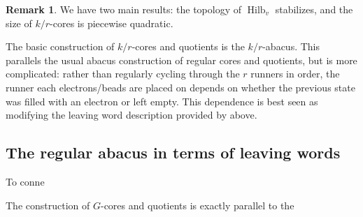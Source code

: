 \documentclass{amsart}[12pt]
\theoremstyle{definition}
\newtheorem{remark}[dummy]{Remark}
\DeclareMathOperator{\Hilb}{Hilb}
\begin{document}
\begin{remark}
We have two main results: the topology of $\Hilb_v$ stabilizes, and the size of $k/r$-cores is piecewise quadratic.

The basic construction of $k/r$-cores and quotients is the $k/r$-abacus.  This parallels the usual abacus construction of regular cores and quotients, but is more complicated: rather than regularly cycling through the $r$ runners in order, the runner each electrons/beads are placed on depends on whether the previous state was filled with an electron or left empty.  This dependence is best seen as modifying the leaving word description provided by above.

\subsection{The regular abacus in terms of leaving words} \label{sec:leaving-words}

To conne




The construction of $G$-cores and quotients is exactly parallel to the 


\begin{center}
\end{center}
\end{remark}
\end{document}

